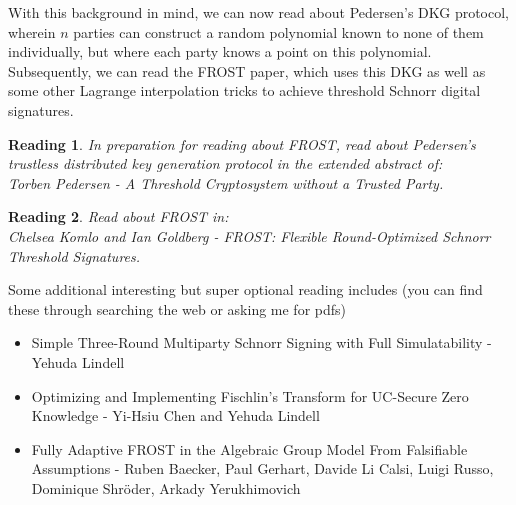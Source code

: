 \documentclass[12pt]{article}
\newtheorem{reading}{Reading}
\theoremstyle{definition}
\theoremstyle{remark}
\theoremstyle{definition}
\begin{document}
With this background in mind, we can now read about Pedersen's DKG protocol, wherein $n$ parties can construct a random polynomial known to none of them individually, but where each party knows a point on this polynomial. Subsequently, we can read the FROST paper, which uses this DKG as well as some other Lagrange interpolation tricks to achieve threshold Schnorr digital signatures.

\begin{reading}
In preparation for reading about FROST, read about Pedersen's trustless distributed key generation protocol in the extended abstract of:\\
Torben Pedersen - A Threshold Cryptosystem without a Trusted Party.
\end{reading}

\begin{reading}
Read about FROST in:\\
Chelsea Komlo and Ian Goldberg - FROST: Flexible Round-Optimized Schnorr Threshold Signatures.
\end{reading}

Some additional interesting but super optional reading includes (you can find these through searching the web or asking me for pdfs)
\begin{itemize}
\item Simple Three-Round Multiparty Schnorr Signing with Full Simulatability - Yehuda Lindell
\item Optimizing and Implementing Fischlin's Transform for UC-Secure Zero Knowledge - Yi-Hsiu Chen and Yehuda Lindell
\item Fully Adaptive FROST in the Algebraic Group Model From Falsifiable Assumptions - Ruben Baecker, Paul Gerhart, Davide Li Calsi, Luigi Russo, Dominique Shr\"{o}der, Arkady Yerukhimovich
\end{itemize}
\end{document}
